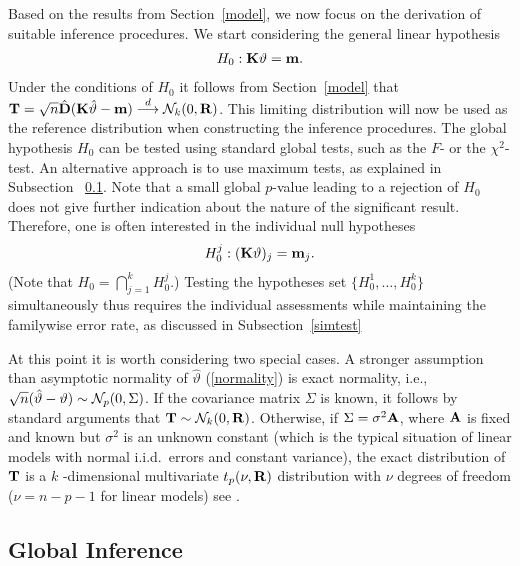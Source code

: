 \documentclass[12pt]{article}
\begin{document}
Based on the results from Section~\ref{model}, we now focus on the
derivation of suitable inference procedures. We start considering the
general linear hypothesis \citep{Searle1971} 
\begin{eqnarray*}
H_0: \mathbf{K} \vartheta = \mathbf{m}.
\end{eqnarray*}
Under the conditions of $H_0$ it follows from Section~\ref{model} that $\mathbf{T} = 
\sqrt{n} \hat{\mathbf{D}} (\mathbf{K} \hat{\vartheta} - \mathbf{m}) \stackrel{d}{\longrightarrow} \mathcal{N}_k(0, \mathbf{R})$. This
limiting distribution will now be used as the reference distribution when
constructing the inference procedures. The global hypothesis $H_0$ can be
tested using standard global tests, such as the $F$- or the $\chi^2$-test.
An alternative approach is to use maximum tests, as explained in Subsection~%
\ref{global}. Note that a small global $p$-value leading to a rejection of $%
H_0$ does not give further indication about the nature of the significant
result. Therefore, one is often interested in the individual null hypotheses 
\begin{eqnarray*}
H_0^j: (\mathbf{K}\vartheta)_j = \mathbf{m}_j.
\end{eqnarray*}
(Note that $H_0 = \bigcap_{j = 1}^k H_0^j$.) Testing the hypotheses set $%
\{H_0^1, \ldots, H_0^k\}$ simultaneously thus requires the individual
assessments while maintaining the familywise error rate, as discussed in
Subsection~\ref{simtest}

At this point it is worth considering two special cases. A stronger
assumption than asymptotic normality of $\hat{\vartheta}$ (\ref{normality})
is exact normality, i.e., $\sqrt{n} (\hat{\vartheta} - \vartheta) \sim \N%
_p(0, \Sigma)$. If the covariance matrix $\Sigma$ is known, it follows by
standard arguments that $\mathbf{T} \sim \mathcal{N}_k(0, \mathbf{R})$. Otherwise, if $\Sigma =
\sigma^2 \mathbf{A}$, where $\mathbf{A}$ is fixed and known but $\sigma^2$ is an unknown
constant (which is the typical situation of linear models with normal
i.i.d.~errors and constant variance), the exact distribution of $\mathbf{T}$ is a $k$%
-dimensional multivariate $t_p(\nu, \mathbf{R})$ distribution with $\nu$ degrees
of freedom ($\nu = n - p - 1$ for linear models) see \citep{Tong1990}.

\subsection{Global Inference}

\label{global} %
\end{document}
